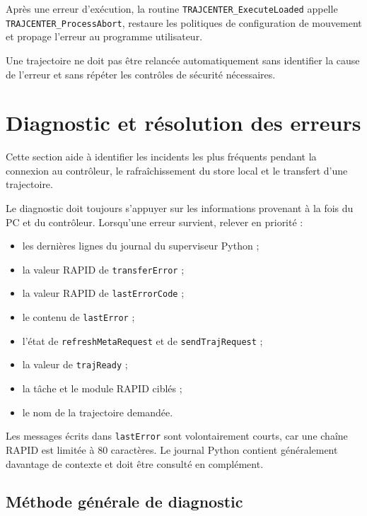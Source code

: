\documentclass{rapportENSAM}
\begin{document}
Après une erreur d'exécution, la routine \texttt{TRAJCENTER\_ExecuteLoaded} appelle
\texttt{TRAJCENTER\_ProcessAbort}, restaure les politiques de configuration
de mouvement et propage l'erreur au programme utilisateur.

Une trajectoire ne doit pas être relancée automatiquement sans identifier la
cause de l'erreur et sans répéter les contrôles de sécurité nécessaires.

\FloatBarrier


\section{Diagnostic et résolution des erreurs}
\label{sec:diagnostic}

Cette section aide à identifier les incidents les plus fréquents pendant la
connexion au contrôleur, le rafraîchissement du store local et le transfert
d'une trajectoire.

Le diagnostic doit toujours s'appuyer sur les informations provenant à la fois
du PC et du contrôleur. Lorsqu'une erreur survient, relever en priorité :

\begin{itemize}
    \item les dernières lignes du journal du superviseur Python ;
    \item la valeur RAPID de \texttt{transferError} ;
    \item la valeur RAPID de \texttt{lastErrorCode} ;
    \item le contenu de \texttt{lastError} ;
    \item l'état de \texttt{refreshMetaRequest} et de
    \texttt{sendTrajRequest} ;
    \item la valeur de \texttt{trajReady} ;
    \item la tâche et le module RAPID ciblés ;
    \item le nom de la trajectoire demandée.
\end{itemize}

Les messages écrits dans \texttt{lastError} sont volontairement courts, car
une chaîne RAPID est limitée à 80 caractères. Le journal Python contient
généralement davantage de contexte et doit être consulté en complément.

\subsection{Méthode générale de diagnostic}
\label{subsec:diagnostic-method}
\end{document}
